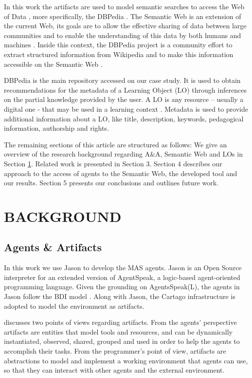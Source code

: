 \documentclass[a4paper,twoside]{article}
\begin{document}
In this work the artifacts are used to model semantic searches to access the Web of Data \cite{refOPQ}, more specifically, the DBPedia \cite{refXYZ}. The Semantic Web is an extension of the current Web, its goals are to allow the effective sharing of data between large communities and to enable the understanding of this data by both humans and machines \cite{ref53,ref54}. Inside this context, the DBPedia project is a community effort to extract structured information from Wikipedia and to make this information accessible on the Semantic Web \cite{refXYZ}.

DBPedia is the main repository accessed on our case study. It is used to obtain recommendations for the metadata of a Learning Object (LO) through inferences on the partial knowledge provided by the user. A LO is any resource – usually a digital one - that may be used in a learning context \cite{ref40}. Metadata is used to provide additional information about a LO, like title, description, keywords, pedagogical information, authorship and rights.

The remaining sections of this article are structured as follows: We give an overview of the research background regarding A\&A, Semantic Web and LOs in Section  \ref{sec:background}. Related work is presented in Section 3. Section 4 describes our approach to the access of agents to the Semantic Web, the developed tool and our results. Section 5 presents our conclusions and outlines future work.


\section{\uppercase{Background}}
\label{sec:background}

\subsection{Agents \& Artifacts}

\noindent In this work we use Jason to develop the MAS agents. Jason \cite{ref35} is an Open Source interpreter for an extended version of AgentSpeak, a logic-based agent-oriented programming language. Given the grounding on AgentsSpeak(L), the agents in Jason follow the BDI model \cite{ref20}. Along with Jason, the Cartago infrastructure is adopted to model the environment as artifacts.

\cite{ref5} discusses two points of views regarding artifacts. From the agents' perspective artifacts are entities that model tools and resources, and can be dynamically instantiated, observed, shared, grouped and used in order to help the agents to accomplish their tasks. From the programmer's point of view, artifacts are abstractions to model and implement a working environment that agents can use, so that they can interact with other agents and the external environment.
\end{document}
